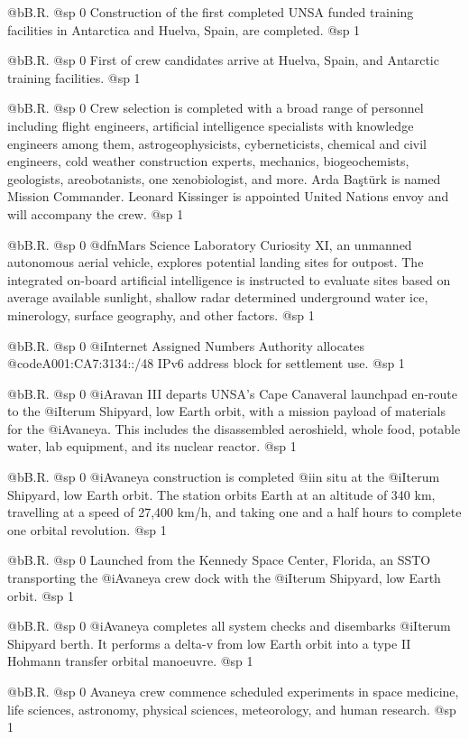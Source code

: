 @b{B.R.}
@sp 0
Construction of the first completed UNSA funded training facilities in Antarctica and Huelva, Spain, are completed.
@sp 1

@b{B.R.}
@sp 0
First of crew candidates arrive at Huelva, Spain, and Antarctic training facilities.
@sp 1

@b{B.R.}
@sp 0
Crew selection is completed with a broad range of personnel including flight engineers, artificial intelligence specialists with knowledge engineers among them, astrogeophysicists, cyberneticists, chemical and civil engineers, cold weather construction experts, mechanics, biogeochemists, geologists, areobotanists, one xenobiologist, and more. Arda Baştürk is named Mission Commander. Leonard Kissinger is appointed United Nations envoy and will accompany the crew.
@sp 1

@b{B.R.}
@sp 0
@dfn{Mars Science Laboratory Curiosity XI}, an unmanned autonomous aerial vehicle, explores potential landing sites for outpost. The integrated on-board artificial intelligence is instructed to evaluate sites based on average available sunlight, shallow radar determined underground water ice, minerology, surface geography, and other factors.
@sp 1

@b{B.R.}
@sp 0
@i{Internet Assigned Numbers Authority} allocates @code{A001:CA7:3134::/48} IPv6 address block for settlement use. 
@sp 1

@b{B.R.}
@sp 0
@i{Aravan III} departs UNSA's Cape Canaveral launchpad en-route to the @i{Iterum Shipyard}, low Earth orbit, with a mission payload of materials for the @i{Avaneya}. This includes the disassembled aeroshield, whole food, potable water, lab equipment, and its nuclear reactor.
@sp 1

@b{B.R.}
@sp 0
@i{Avaneya} construction is completed @i{in situ} at the @i{Iterum Shipyard}, low Earth orbit. The station orbits Earth at an altitude of 340 km, travelling at a speed of 27,400 km/h, and taking one and a half hours to complete one orbital revolution.
@sp 1

@b{B.R.}
@sp 0
Launched from the Kennedy Space Center, Florida, an SSTO transporting the @i{Avaneya} crew dock with the @i{Iterum Shipyard}, low Earth orbit.
@sp 1

@b{B.R.}
@sp 0
@i{Avaneya} completes all system checks and disembarks @i{Iterum Shipyard} berth. It performs a delta-v from low Earth orbit into a type II Hohmann transfer orbital manoeuvre.
@sp 1

@b{B.R.}
@sp 0
Avaneya crew commence scheduled experiments in space medicine, life sciences, astronomy, physical sciences, meteorology, and human research.
@sp 1

